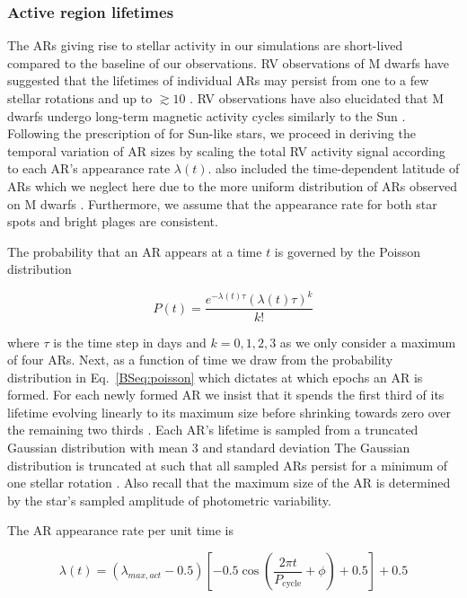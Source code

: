 \subsubsection{Active region lifetimes} \label{BSsect:lifetimes}
The ARs giving rise to stellar activity in our simulations are short-lived compared to the baseline
of our observations. RV observations of M dwarfs have suggested that the lifetimes of individual ARs
may persist from one to a few stellar rotations and up to $\gtrsim 10$
\citep[e.g.][]{bonfils07,forveille09,hebrard16}. RV observations have also elucidated that M dwarfs undergo
long-term magnetic
activity cycles similarly to the Sun \citep[e.g.][]{gomesdasilva12, route16}. Following the prescription
of \cite{dumusque16a} for Sun-like stars, we proceed in deriving the temporal variation of AR sizes by scaling the
total RV activity signal according to each AR's appearance rate $\lambda(t)$. \cite{dumusque16a} also included
the time-dependent latitude of ARs which we neglect here due to the more uniform distribution of ARs observed
on M dwarfs \citep{barnes01, barnes04}. Furthermore, we assume that the appearance rate for both star spots and
bright plages are consistent.

The probability that an AR appears at a time $t$ is governed by the Poisson distribution

\begin{equation}
  P(t) = \frac{e^{-\lambda(t) \tau} (\lambda(t) \tau)^k}{k!} \label{BSeq:poisson}
\end{equation}

\noindent where $\tau$ is the time step in days and $k=0,1,2,3$ as we only consider a maximum of
four ARs. Next, as a function of time we draw from the probability distribution in Eq.~\ref{BSeq:poisson} 
which dictates at which epochs an AR is formed. For each newly formed AR 
we insist that it spends the first third of its lifetime evolving linearly to its maximum size before
shrinking towards zero over the remaining two thirds \citep{dumusque16a}.
Each AR's lifetime is sampled from a truncated Gaussian distribution with mean 3\prot{} and standard
deviation  The Gaussian distribution is truncated at \prot{} such that all sampled ARs persist
for a minimum of one stellar rotation \citep[e.g.][]{bonfils07,forveille09,hebrard16}.
Also recall that the maximum size of the AR is determined by the star's sampled amplitude of photometric
variability.

The AR appearance rate per unit time is

\begin{equation}
  \lambda(t) = (\lambda_{max,act} - 0.5) \left[ -0.5 \cos{\left( \frac{2\pi t}{P_{\text{cycle}}} + \phi \right)} + 0.5 \right] + 0.5
\label{BSeq:lambda}
\end{equation}

